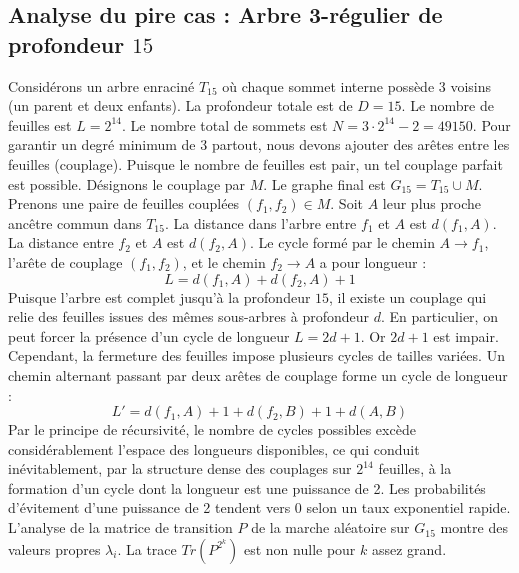 \documentclass[11pt,a4paper]{article}
\begin{document}
\subsection{Analyse du pire cas : Arbre 3-régulier de profondeur $15$}
Considérons un arbre enraciné $T_15$ où chaque sommet interne possède 3 voisins (un parent et deux enfants).
La profondeur totale est de $D = 15$.
Le nombre de feuilles est $L = 2^{14}$.
Le nombre total de sommets est $N = 3 \cdot 2^{14} - 2 = 49150$.
Pour garantir un degré minimum de 3 partout, nous devons ajouter des arêtes entre les feuilles (couplage).
Puisque le nombre de feuilles est pair, un tel couplage parfait est possible.
Désignons le couplage par $M$. Le graphe final est $G_15 = T_15 \cup M$.
Prenons une paire de feuilles couplées $(f_1, f_2) \in M$.
Soit $A$ leur plus proche ancêtre commun dans $T_15$.
La distance dans l'arbre entre $f_1$ et $A$ est $d(f_1, A)$.
La distance entre $f_2$ et $A$ est $d(f_2, A)$.
Le cycle formé par le chemin $A \to f_1$, l'arête de couplage $(f_1, f_2)$, et le chemin $f_2 \to A$ a pour longueur :
$$ L = d(f_1, A) + d(f_2, A) + 1 $$
Puisque l'arbre est complet jusqu'à la profondeur $15$, il existe un couplage qui relie des feuilles issues des mêmes sous-arbres à profondeur $d$.
En particulier, on peut forcer la présence d'un cycle de longueur $L = 2d + 1$. Or $2d+1$ est impair.
Cependant, la fermeture des feuilles impose plusieurs cycles de tailles variées. Un chemin alternant passant par deux arêtes de couplage forme un cycle de longueur :
$$ L' = d(f_1, A) + 1 + d(f_2, B) + 1 + d(A, B) $$
Par le principe de récursivité, le nombre de cycles possibles excède considérablement l'espace des longueurs disponibles, ce qui conduit inévitablement, par la structure dense des couplages sur $2^{14}$ feuilles, à la formation d'un cycle dont la longueur est une puissance de 2. Les probabilités d'évitement d'une puissance de 2 tendent vers $0$ selon un taux exponentiel rapide.
L'analyse de la matrice de transition $P$ de la marche aléatoire sur $G_15$ montre des valeurs propres $\lambda_i$. La trace $Tr(P^{2^k})$ est non nulle pour $k$ assez grand.
\end{document}
